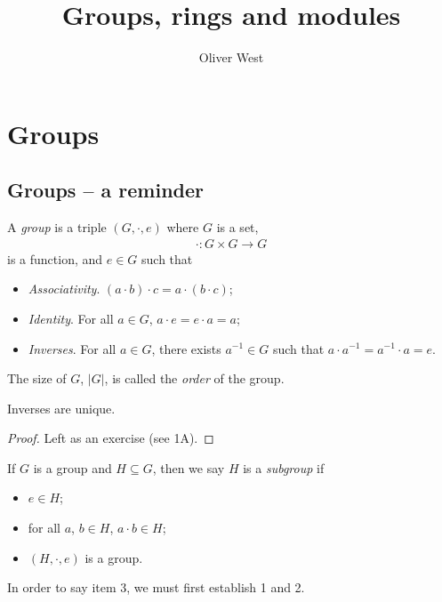 \documentclass{../../template/note}
\author{Oliver West}
\title{Groups, rings and modules}
\date{}
\begin{document}
    \maketitle

    \tableofcontents


    \section{Groups}

    \subsection{Groups -- a reminder}

    \begin{definition}
        A \emph{group} is a triple $(G, \cdot, e)$ where $G$ is a set, 
        \begin{align*}
            \cdot: G \times G \to G
        \end{align*}
        is a function, and $e \in G$ such that
        \begin{itemize}
            \item \emph{Associativity}. $(a \cdot b) \cdot c = a \cdot (b \cdot c)$;
            \item \emph{Identity}. For all $a \in G$, $a \cdot e = e \cdot a = a$;
            \item \emph{Inverses}. For all $a \in G$, there exists $a^{-1} \in G$ such that $a \cdot a^{-1} = a^{-1} \cdot a = e$.
        \end{itemize}
        The size of $G$, $|G|$, is called the \emph{order} of the group. 
    \end{definition}
    
    \begin{proposition}
        Inverses are unique.
    \end{proposition}

    \begin{proof}
        Left as an exercise (see 1A).
    \end{proof}
    
    \begin{definition}[Subgroups]
        If $G$ is a group and $H \subseteq G$, then we say $H$ is a \emph{subgroup} if
        \begin{itemize}
            \item $e \in H$;
            \item for all $a$, $b \in H$, $a \cdot b \in H$;
            \item $(H, \cdot, e)$ is a group.
        \end{itemize}
        In order to say item 3, we must first establish 1 and 2.
    \end{definition}
    
\end{document}
